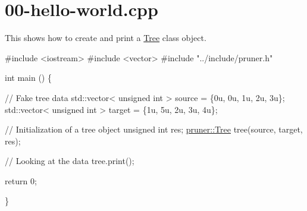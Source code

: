 \hypertarget{00-hello-world_8cpp-example}{}\section{00-\/hello-\/world.\+cpp}
This shows how to create and print a \hyperlink{classTree}{Tree} class object.


\begin{DoxyCodeInclude}
\textcolor{preprocessor}{#include <iostream>}
\textcolor{preprocessor}{#include <vector>}
\textcolor{preprocessor}{#include "../include/pruner.h"}

\textcolor{keywordtype}{int} main () \{
  
  \textcolor{comment}{// Fake tree data}
  std::vector< unsigned int > source = \{0u, 0u, 1u, 2u, 3u\};
  std::vector< unsigned int > target = \{1u, 5u, 2u, 3u, 4u\};

  \textcolor{comment}{// Initialization of a tree object}
  \textcolor{keywordtype}{unsigned} \textcolor{keywordtype}{int} res;
  \hyperlink{classpruner_1_1Tree}{pruner::Tree} tree(source, target, res);
  
  \textcolor{comment}{// Looking at the data}
  tree.print();         
  
  
  \textcolor{keywordflow}{return} 0;
  
\}
\end{DoxyCodeInclude}
 